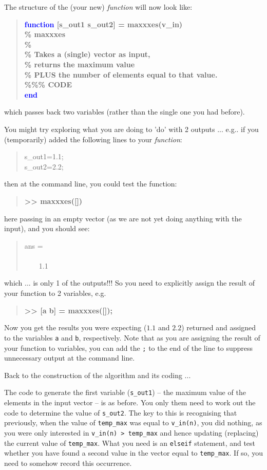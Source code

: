 \documentclass{tufte-book} %
\newenvironment{docspec}{\begin{quotation}\ttfamily\parskip0pt\parindent0pt\ignorespaces}{\end{quotation}}
\newenvironment{docspecbold}{\begin{quotation}\ttfamily\bfseries\parskip0pt\parindent0pt\ignorespaces}{\end{quotation}}
\begin{document}
The structure of  the (your new) \textit{function} will now look like:
\begin{docspecbold}
\textcolor{blue}{function} [s\_out1 s\_out2] = maxxxes(v\_in)\\
\textcolor[rgb]{0,0.501961,0}{\% maxxxes\\
\%\\
\% Takes a (single) vector as input, \\ \% returns the maximum value
\\ \% PLUS the number of elements equal to that value.}\\
\textcolor[rgb]{0,0.501961,0}{\%\%\% CODE} \\
\textcolor{blue}{end}
\end{docspecbold}
which passes back two variables (rather than the single one you had before).

You might try exploring what you are doing to 'do' with 2 outputs ... e.g.. if you (temporarily) added the following lines to your \textit{function}:
\begin{docspec}
s\_out1=1.1;\\
s\_out2=2.2;
\end{docspec}
then at the command line, you could test the function:
\begin{docspecbold}
>> maxxxes([])
\end{docspecbold}
here passing in an empty vector (as we are not yet doing anything with the input), and you should see:
\begin{docspec}
ans =\\
\ \\
\ \ \ \ 1.1
\end{docspec}
which ... is only 1 of the outputs!!! So you need to explicitly assign the result of your function to 2 variables, e.g.
\begin{docspecbold}
>> [a b] = maxxxes([]);
\end{docspecbold}
Now you get the results you were expecting (\(1.1\) and \(2.2\)) returned and assigned to the variables \texttt{a} and \texttt{b}, respectively. Note that as you are assigning the result of your function to variables, you can add the \texttt{;} to the end of the line to suppress unnecessary output at the command line.

Back to the construction of the algorithm and its coding ...

The code to generate the first variable (\texttt{s\_out1}) -- the maximum value of the elements in the input vector -- is as before. You only them need to work out the code to determine the value of \texttt{s\_out2}. The key to this is recognising that previously, when the value of \texttt{temp\_max} was equal to \texttt{v\_in(n)}, you did nothing, as you were only interested in \texttt{v\_in(n) > temp\_max} and hence updating (replacing) the current value of \texttt{temp\_max}. What you need is an \texttt{elseif} statement, and test whether you have found a second value in the vector equal to \texttt{temp\_max}. If so, you need to somehow record this occurrence.
\end{document}
